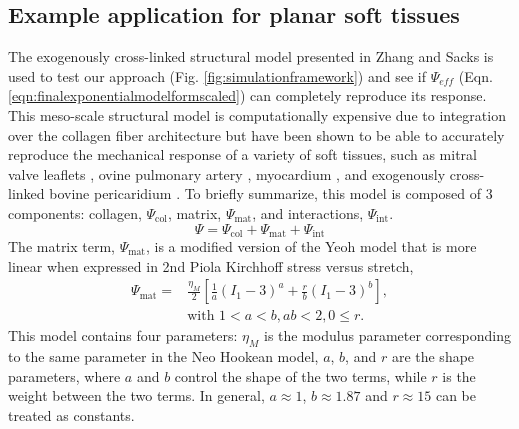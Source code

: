 
\subsection{Example application for planar soft tissues}

	The exogenously cross-linked structural model presented in Zhang and Sacks \cite{zhang_modeling_2017} is used to test our approach (Fig. \ref{fig:simulationframework}) and see if $\Psi_{eff}$ (Eqn. \ref{eqn:finalexponentialmodelformscaled}) can completely reproduce its response. This meso-scale structural model is computationally expensive due to integration over the collagen fiber architecture but have been shown to be able to accurately reproduce the mechanical response of a variety of soft tissues, such as mitral valve leaflets \cite{zhang_meso_2016}, ovine pulmonary artery \cite{fata_insights_2014}, myocardium \cite{avazmohammadi_novel_2016}, and exogenously cross-linked bovine pericaridium \cite{sacks_novel_2015}. To briefly summarize, this model is composed of 3 components: collagen, $\Psi_\mathrm{col}$, matrix, $\Psi_\mathrm{mat}$, and interactions, $\Psi_\mathrm{int}$. 
\begin{equation}
\Psi     = \Psi_\mathrm{col} + \Psi_\mathrm{mat} + \Psi_\mathrm{int} \label{eqn:structuralmodelcomponents}
\end{equation}
    The matrix term, $\Psi_\mathrm{mat}$, is a modified version of the Yeoh model that is more linear when expressed in 2nd Piola Kirchhoff stress versus stretch, 
\begin{equation}\label{eqn:matrixmodel}
\begin{aligned}
\Psi_\mathrm{mat} = &\frac{\eta_M}{2} \left[ \frac{1}{a}\left( I_1 -3\right)^{a} + \frac{r}{b} \left( I_1 -3\right)^{b} \right], \\
&\text{with } 1<a<b, ab <2, 0 \leq r.
\end{aligned}
\end{equation}
    This model contains four parameters: $\eta_M$ is the modulus parameter corresponding to the same parameter in the Neo Hookean model, $a$, $b$, and $r$ are the shape parameters, where $a$ and $b$ control the shape of the two terms, while $r$ is the weight between the two terms. In general, $a \approx 1$, $b \approx 1.87$ and $r \approx 15$ can be treated as constants. 


